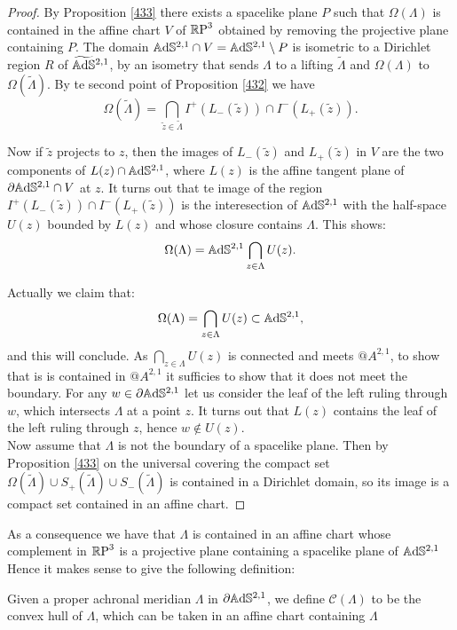 \begin{proof}
    By Proposition \ref{433} there exists a spacelike plane $P$ such that $\Omega(\Lambda)$ is contained in the affine chart $V$ of $\mathbb{R}\text{P}^3$ obtained by removing the projective plane containing $P$. The domain $\mathbb{A}\mathrm{d}\mathbb{S}^{2,1}\cap V=\mathbb{A}\mathrm{d}\mathbb{S}^{2,1}\setminus P$ is isometric to a Dirichlet region $R$ of $\widetilde{\mathbb{A}\mathrm{d}\mathbb{S}}{}^{2,1}$, by an isometry that sends $\Lambda$ to a lifting $\widetilde{\Lambda}$ and $\Omega(\Lambda)$ to $\Omega(\widetilde{\Lambda})$. By te second point of Proposition \ref{432} we have 
    \[
        \Omega(\widetilde{\Lambda})=\bigcap_{\widetilde{z}\in\widetilde{\Lambda}}I^+(L_-(\widetilde{z}))\cap I^-(L_+(\widetilde{z})).
    \]

    Now if $\widetilde{z}$ projects to $z$, then the images of $L_-(\widetilde{z})$ and $L_+(\widetilde{z})$ in $V$ are the two components of $L(z)\cap \mathbb{A}\mathrm{d}\mathbb{S}^{2,1}$, where $L(z)$ is the affine tangent plane of $\partial\mathbb{A}\mathrm{d}\mathbb{S}^{2,1}\cap V$ at $z$. It turns out that te image of the region $I^+(L_-(\widetilde{z}))\cap I^-(L_+(\widetilde{z}))$ is the interesection of $\mathbb{A}\mathrm{d}\mathbb{S}^{2,1}$ with the half-space $U(z)$ bounded by $L(z)$ and whose closure contains $\Lambda$. This shows: 
\[
    \Omega(\Lambda)=\mathbb{A}\mathrm{d}\mathbb{S}^{2,1}\bigcap_{z\in\Lambda}U(z).
\] 

Actually we claim that:
\[
    \Omega(\Lambda)=\bigcap_{z\in\Lambda}U(z)\subset \mathbb{A}\mathrm{d}\mathbb{S}^{2,1},
\]
and this will conclude. As $\bigcap_{z\in\Lambda}U(z)$ is connected and meets $@A^{2,1}$, to show that is is contained in $@A^{2,1}$ it sufficies to show that it does not meet the boundary. For any $w\in\partial\mathbb{A}\mathrm{d}\mathbb{S}^{2,1}$ let us consider the leaf of the left ruling through $w$, which intersects $\Lambda$ at a point $z$. It turns out that $L(z)$ contains the leaf of the left ruling through $z$, hence $w\notin U(z)$. \\
Now assume that $\Lambda$ is not the boundary of a spacelike plane. Then by Proposition \ref{433} on the universal covering the compact set $\Omega(\widetilde{\Lambda})\cup S_+(\widetilde{\Lambda})\cup S_-(\widetilde{\Lambda})$ is contained in a Dirichlet domain, so its image is a compact set contained in an affine chart.
\end{proof}

As a consequence we have that $\Lambda$ is contained in an affine chart whose complement in $\mathbb{R}\text{P}^3$ is a projective plane containing a spacelike plane of $\mathbb{A}\mathrm{d}\mathbb{S}^{2,1}$ Hence it makes sense to give the following definition:

\begin{definition}
    Given a proper achronal meridian $\Lambda$ in $\partial\mathbb{A}\mathrm{d}\mathbb{S}^{2,1}$, we define $\mathcal{C}(\Lambda)$ to be the convex hull of $\Lambda$, which can be taken in an affine chart containing $\Lambda$
\end{definition}


